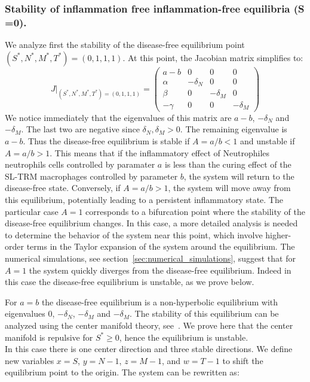 \documentclass[a4paper, 12pt]{article}
\providecommand{\DIFaddtex}[1]{{\protect\color{blue} \sf #1}} %
\providecommand{\DIFdeltex}[1]{{\protect\color{red} \scriptsize #1}} %
\providecommand{\DIFaddbegin}{} %
\providecommand{\DIFaddend}{} %
\providecommand{\DIFdelbegin}{} %
\providecommand{\DIFdelend}{} %
\providecommand{\DIFadd}[1]{\texorpdfstring{\DIFaddtex{#1}}{#1}} %
\providecommand{\DIFdel}[1]{\texorpdfstring{\DIFdeltex{#1}}{}} %
\begin{document}
\subsubsection{Stability of  \DIFdelbegin \DIFdel{inflammation free }\DIFdelend \DIFaddbegin \DIFadd{inflammation-free }\DIFaddend equilibria (S =0).}\label{sec:stab}
We analyze first the stability of the disease-free equilibrium point $(S^*, N^*, M^*, T^*) = (0, 1, 1, 1)$.
At this point, the Jacobian matrix simplifies to:
\[
J|_{(S^*, N^*, M^*, T^*) = (0, 1, 1, 1)} =
\begin{pmatrix}
a - b & 0 & 0 & 0 \\
\alpha & - \delta_N & 0 & 0 \\
\beta & 0 & -\delta_M & 0 \\
-\gamma & 0 & 0 & -\delta_M
\end{pmatrix}
\]
We notice immediately that the eigenvalues of this matrix are  $a-b$, $-\delta_N$ and $-\delta_M$.
 The last two are negative since $\delta_N, \delta_M > 0$. The remaining eigenvalue  is $a-b$. Thus the disease-free equilibrium is stable if $A = a/b < 1$ and unstable if $A =a/b > 1$. 
This means that if the inflammatory effect of \DIFdelbegin \DIFdel{Neutrophiles }\DIFdelend \DIFaddbegin \DIFadd{neutrophils }\DIFaddend cells controlled by paramater $a$ is less than the curing effect of the  SL-TRM macrophages controlled by parameter $b$, the system will return to the disease-free state.
 Conversely, if $A=a/b > 1$, the system will move away from this equilibrium, potentially leading to a persistent inflammatory state.
The particular case $A=1$ corresponds to a bifurcation point where the stability of the disease-free equilibrium changes. In this case, a more detailed analysis is needed to determine the behavior of the system near this point, which  involve higher-order terms in the Taylor expansion of the system around the equilibrium.
The numerical simulations, see section~\ref{sec:numerical_simulations}, suggest that for $A=1$ the system quickly diverges from the disease-free equilibrium. 
Indeed in this case the disease-free equilibrium is unstable, as we prove below.
\par For $a=b$ the disease-free equilibrium is a non-hyperbolic equilibrium with eigenvalues $0$, $-\delta_N$, $-\delta_M$ and $-\delta_M$. 
The stability of this equilibrium can be analyzed using the center manifold theory, see~\cite{perko}. We prove here that the center manifold is repulsive for $S^* \geq 0$, hence the equilibrium is unstable.\\
In this case there is one center direction and three stable directions. We define new variables $x=S$, $y=N-1$, $z=M-1$, and $w=T-1$ to shift the equilibrium point to the origin. The system can be rewritten as:
\end{document}
